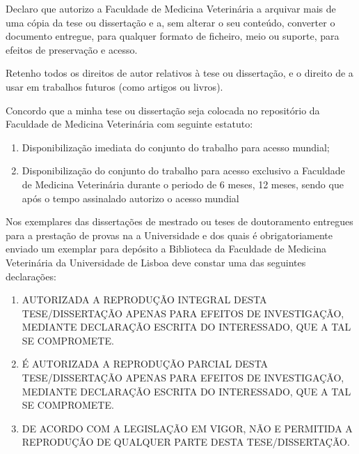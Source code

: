 Declaro que autorizo a Faculdade de Medicina Veterinária a arquivar mais de uma cópia da tese ou dissertação e a, sem
alterar o seu conteúdo, converter o documento entregue, para qualquer formato de ficheiro, meio ou suporte, para efeitos
de preservação e acesso.

Retenho todos os direitos de autor relativos à tese ou dissertação, e o direito de a usar em trabalhos futuros (como artigos ou livros).

Concordo que a minha tese ou dissertação seja colocada no repositório da Faculdade de Medicina Veterinária com
seguinte estatuto:
\begin{enumerate}
  \item {} 
        Disponibilização imediata do conjunto do trabalho para acesso mundial;
  \item {}
        Disponibilização do conjunto do trabalho para acesso exclusivo a Faculdade de Medicina Veterinária durante
o periodo de 
6 meses, 
12 meses, sendo que após o tempo assinalado autorizo o acesso mundial%
\end{enumerate}

{\footnotesize Nos exemplares das dissertações de mestrado ou teses de doutoramento entregues para a prestação de provas na a
Universidade e dos quais é obrigatoriamente enviado um exemplar para depósito a Biblioteca da Faculdade de Medicina
Veterinária da Universidade de Lisboa deve constar uma das seguintes declarações:}
\begin{enumerate}
  \item [\IfStrEq{\theavailability(reproduction)}{I}{\memoryxbox}{\memoryemptybox}] 
        AUTORIZADA A REPRODUÇÃO INTEGRAL DESTA TESE/DISSERTAÇÃO APENAS PARA EFEITOS DE INVESTIGAÇÃO, 
        MEDIANTE DECLARAÇÃO ESCRITA DO INTERESSADO, QUE A TAL SE COMPROMETE.
  \item [\IfStrEq{\theavailability(reproduction)}{P}{\memoryxbox}{\memoryemptybox}] 
        É AUTORIZADA A REPRODUÇÃO PARCIAL DESTA TESE/DISSERTAÇÃO APENAS PARA EFEITOS DE INVESTIGAÇÃO, 
        MEDIANTE DECLARAÇÃO ESCRITA DO INTERESSADO, QUE A TAL SE COMPROMETE.
  \item [\IfStrEq{\theavailability(reproduction)}{N}{\memoryxbox}{\memoryemptybox}] 
        DE ACORDO COM A LEGISLAÇÃO EM VIGOR, NÃO E PERMITIDA A REPRODUÇÃO DE QUALQUER PARTE DESTA 
        TESE/DISSERTAÇÃO.
\end{enumerate}
  
